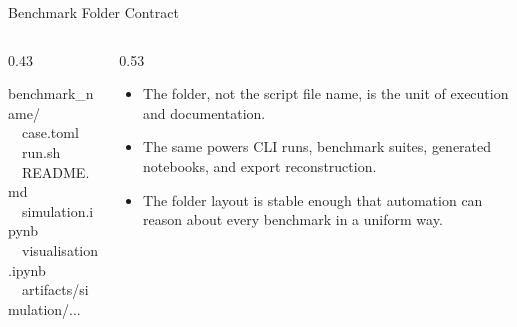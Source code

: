 \documentclass[aspectratio=169,10pt]{beamer}
\begin{document}

\begin{frame}{Benchmark Folder Contract}
\small
\begin{columns}[T,totalwidth=\textwidth]
\begin{column}{0.43\textwidth}
\begin{pseudobox}
benchmark\_name/\\
\ \ case.toml\\
\ \ run.sh\\
\ \ README.md\\
\ \ simulation.ipynb\\
\ \ visualisation.ipynb\\
\ \ artifacts/simulation/...
\end{pseudobox}
\end{column}
\begin{column}{0.53\textwidth}
\begin{softbox}
\begin{itemize}
  \item The folder, not the script file name, is the unit of execution and documentation.
  \item The same  powers CLI runs, benchmark suites, generated notebooks, and export reconstruction.
  \item The folder layout is stable enough that automation can reason about every benchmark in a uniform way.
\end{itemize}
\end{softbox}
\end{column}
\end{columns}
\end{frame}
\end{document}
